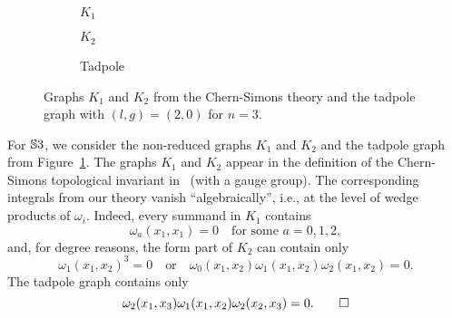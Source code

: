 \documentclass[\MainFolder/Text.tex]{subfiles}
\begin{document}
\begin{Remark}
\end{Remark}

\begin{Remark}\label{Rem:GraphsThreeSphere}
{ \begingroup
\begin{figure}
\centering
\begin{subfigure}{0.45\textwidth}
\centering

\caption{$K_1$}
\end{subfigure}
\begin{subfigure}{0.45\textwidth}
\centering

\caption{$K_2$}
\end{subfigure}
\begin{subfigure}{0.45\textwidth}
\centering

\caption{Tadpole}
\end{subfigure}
\caption[Graphs $K_1$, $K_2$ and the tadpole graph from Chern-Simons theory.]{Graphs $K_1$ and $K_2$ from the Chern-Simons theory and the tadpole graph with $(l,g)=(2,0)$ for $n=3$.}\label{Fig:K1K2}
\end{figure}
\endgroup }

For $\mathbb{S}{3}$, we consider the non-reduced graphs $K_1$ and $K_2$ and the tadpole graph from Figure~\ref{Fig:K1K2}. The graphs $K_1$ and $K_2$ appear in the definition of the Chern-Simons topological invariant in~\cite{Kohno2002} (with a gauge group). The corresponding integrals from our theory vanish ``algebraically'', i.e., at the level of wedge products of $\omega_i$. Indeed, every summand in $K_1$ contains 
\[ \omega_a(x_1,x_1) = 0\quad \text{for some }a=0, 1, 2, \]
and, for degree reasons, the form part of $K_2$ can contain   only
\[ \omega_1(x_1,x_2)^3=0\quad\text{or}\quad\omega_0(x_1,x_2)\omega_{1}(x_1,x_2)\omega_{2}(x_1,x_2)=0.\] 
The tadpole graph contains only
\begin{equation*}
 \omega_2(x_1,x_3)\omega_1(x_1,x_2)\omega_2(x_2,x_3) = 0.\qedhere \end{equation*}
\qedhere
\end{Remark}
\end{document}
